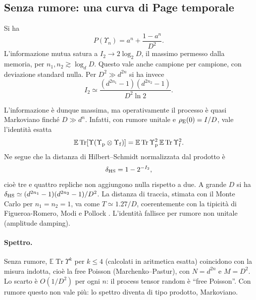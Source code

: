 \subsection{Senza rumore: una curva di Page temporale}
Si ha
\[
P(\Upsilon_n)=a^n+\frac{1-a^n}{D^2}.
\]
L'informazione mutua satura a $I_2\to2\log_2D$, il massimo permesso dalla memoria, per $n_1,n_2\gtrsim\log_dD$. Questo vale anche campione per campione, con deviazione standard nulla. Per $D^2\gg d^{2n}$ si ha invece
\[
I_2\simeq\frac{(d^{2n_1}-1)(d^{2n_2}-1)}{D^2\ln2}.
\]

L'informazione è dunque massima, ma operativamente il processo è quasi Markoviano finché $D\gg d^n$. Infatti, con rumore unitale e $\rho_{\rm E}(0)=I/D$, vale l'identità esatta
\[
\mathbb E\operatorname{Tr}[\Upsilon(\Upsilon_{\rm p}\otimes\Upsilon_{\rm f})]=\mathbb E\operatorname{Tr}\Upsilon_{\rm p}^2\,\mathbb E\operatorname{Tr}\Upsilon_{\rm f}^2 .
\]
Ne segue che la distanza di Hilbert--Schmidt normalizzata dal prodotto è
\[
\delta_{\rm HS}=1-2^{-I_2},
\]
cioè tre e quattro repliche non aggiungono nulla rispetto a due. A grande $D$ si ha $\delta_{\rm HS}\simeq(d^{2n_1}-1)(d^{2n_2}-1)/D^2$. La distanza di traccia, stimata con il Monte Carlo per $n_1=n_2=1$, va come $T\simeq1.27/D$, coerentemente con la tipicità di Figueroa-Romero, Modi e Pollock \cite{FMP19,FPM21}. L'identità fallisce per rumore non unitale (amplitude damping).

\paragraph{Spettro.} Senza rumore, $\mathbb E\operatorname{Tr}\Upsilon^k$ per $k\le4$ (calcolati in aritmetica esatta) coincidono con la misura indotta, cioè la free Poisson (Marchenko--Pastur), con $N=d^{2n}$ e $M=D^2$. Lo scarto è $O(1/D^2)$ per ogni $n$: il process tensor random è ``free Poisson''. Con rumore questo non vale più: lo spettro diventa di tipo prodotto, Markoviano.

